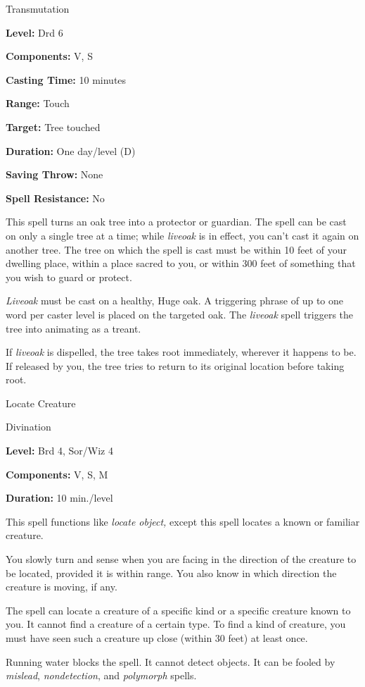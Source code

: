 \documentclass{article}
\begin{document}
Transmutation

\textbf{Level:} Drd 6

\textbf{Components:} V, S

\textbf{Casting Time:} 10 minutes

\textbf{Range:} Touch

\textbf{Target:} Tree touched

\textbf{Duration:} One day/level (D)

\textbf{Saving Throw:} None

\textbf{Spell Resistance:} No

This spell turns an oak tree into a protector or guardian. The spell can be cast 
on only a single tree at a time; while \textit{liveoak }is in effect, you can't 
cast it again on another tree. The tree on which the spell is cast must be within 
10 feet of your dwelling place, within a place sacred to you, or within 300 feet 
of something that you wish to guard or protect.

\textit{Liveoak }must be cast on a healthy, Huge oak. A triggering phrase of up 
to one word per caster level is placed on the targeted oak. The \textit{liveoak 
}spell triggers the tree into animating as a treant. 

If \textit{liveoak }is dispelled, the tree takes root immediately, wherever it 
happens to be. If released by you, the tree tries to return to its original location 
before taking root.

\vspace{12pt}
Locate Creature

Divination

\textbf{Level:} Brd 4, Sor/Wiz 4

\textbf{Components:} V, S, M

\textbf{Duration:} 10 min./level

This spell functions like \textit{locate object, }except this spell locates a known 
or familiar creature.

You slowly turn and sense when you are facing in the direction of the creature 
to be located, provided it is within range. You also know in which direction the 
creature is moving, if any.

The spell can locate a creature of a specific kind or a specific creature known 
to you. It cannot find a creature of a certain type. To find a kind of creature, 
you must have seen such a creature up close (within 30 feet) at least once.

Running water blocks the spell. It cannot detect objects. It can be fooled by \textit{mislead}, 
\textit{nondetection}, and \textit{polymorph }spells.
\end{document}
